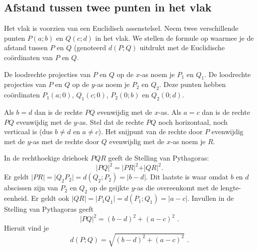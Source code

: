 \subsection{Afstand tussen twee punten in het vlak}
\noindent

Het vlak is voorzien van een Euclidisch assenstelsel.
Neem twee verschillende punten $P(a;b)$ en $Q(c;d)$ in het vlak.
We stellen de formule op waarmee je de afstand tussen $P$ en $Q$ (genoteerd $d(P;Q)$ uitdrukt met de Euclidische co\"ordinaten van $P$ en $Q$.

De loodrechte projecties van $P$ en $Q$ op de $x$-as noem je $P_1$ en $Q_1$.
De loodrechte projecties van $P$ en $Q$ op de $y$-as noem je $P_2$ en $Q_2$.
Deze punten hebben co\"ordinaten $P_1(a;0)$, $Q_1(c;0)$, $P_2(0;b)$ en $Q_2(0;d)$.

Als $b=d$ dan is de rechte $PQ$ evenwijdig met de $x$-as.
Als $a=c$ dan is de rechte $PQ$ evenwijdig met de $y$-as.
Stel dat de rechte $PQ$ noch horizontaal, noch verticaal is (dus $b\neq d$ en $a \neq c$).
Het snijpunt van de rechte door $P$ evenwijdig met de $y$-as met de rechte door $Q$ evenwijdig met de $x$-as noem je $R$.



In de rechthoekige driehoek $PQR$ geeft de Stelling van Pythagoras:
\[
\vert PQ \vert ^2= \vert PR \vert ^2+ \vert QR \vert ^2 \text {.}
\]
Er geldt $\vert PR \vert = \vert Q_2P_2 \vert = d(Q_2;P_2)=\vert b-d \vert$.
Dit laatste is waar omdat $b$ en $d$ abscissen zijn van $P_2$ en $Q_2$ op de geijkte $y$-as die overeenkomt met de lengte-eenheid.
Er geldt ook $\vert QR \vert = \vert P_1Q_1 \vert = d(P_1;Q_1)=\vert a-c \vert$.
Invullen in de Stelling van Pythagoras geeft
\[
\vert PQ \vert ^2=(b-d)^2+(a-c)^2 \text{ .}
\]
Hieruit vind je
\[
d(P;Q)=\sqrt{(b-d)^2+(a-c)^2} \text { .}
\]\vspace{2mm}

